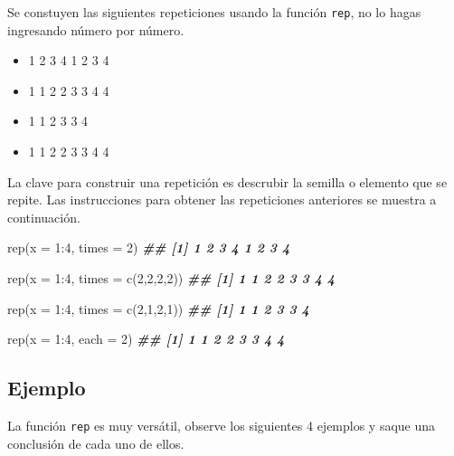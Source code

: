 \documentclass[
]{book}
\newenvironment{Shaded}{\begin{snugshade}}{\end{snugshade}}
\newcommand{\AttributeTok}[1]{\textcolor[rgb]{0.77,0.63,0.00}{#1}}
\newcommand{\DecValTok}[1]{\textcolor[rgb]{0.00,0.00,0.81}{#1}}
\newcommand{\DocumentationTok}[1]{\textcolor[rgb]{0.56,0.35,0.01}{\textbf{\textit{#1}}}}
\newcommand{\FunctionTok}[1]{\textcolor[rgb]{0.00,0.00,0.00}{#1}}
\newcommand{\NormalTok}[1]{#1}
\newcommand{\SpecialCharTok}[1]{\textcolor[rgb]{0.00,0.00,0.00}{#1}}
\providecommand{\tightlist}{%
  \setlength{\itemsep}{0pt}\setlength{\parskip}{0pt}}
\begin{document}
Se constuyen las siguientes repeticiones usando la función \texttt{rep}, no lo hagas ingresando número por número.

\begin{itemize}
\tightlist
\item
  1 2 3 4 1 2 3 4
\item
  1 1 2 2 3 3 4 4
\item
  1 1 2 3 3 4
\item
  1 1 2 2 3 3 4 4
\end{itemize}

La clave para construir una repetición es descrubir la semilla o elemento que se repite. Las instrucciones para obtener las repeticiones anteriores se muestra a continuación.

\begin{Shaded}
\begin{Highlighting}[]
\FunctionTok{rep}\NormalTok{(}\AttributeTok{x =} \DecValTok{1}\SpecialCharTok{:}\DecValTok{4}\NormalTok{, }\AttributeTok{times =} \DecValTok{2}\NormalTok{)}
\DocumentationTok{\#\# [1] 1 2 3 4 1 2 3 4}

\FunctionTok{rep}\NormalTok{(}\AttributeTok{x =} \DecValTok{1}\SpecialCharTok{:}\DecValTok{4}\NormalTok{, }\AttributeTok{times =} \FunctionTok{c}\NormalTok{(}\DecValTok{2}\NormalTok{,}\DecValTok{2}\NormalTok{,}\DecValTok{2}\NormalTok{,}\DecValTok{2}\NormalTok{))}
\DocumentationTok{\#\# [1] 1 1 2 2 3 3 4 4}

\FunctionTok{rep}\NormalTok{(}\AttributeTok{x =} \DecValTok{1}\SpecialCharTok{:}\DecValTok{4}\NormalTok{, }\AttributeTok{times =} \FunctionTok{c}\NormalTok{(}\DecValTok{2}\NormalTok{,}\DecValTok{1}\NormalTok{,}\DecValTok{2}\NormalTok{,}\DecValTok{1}\NormalTok{))}
\DocumentationTok{\#\# [1] 1 1 2 3 3 4}

\FunctionTok{rep}\NormalTok{(}\AttributeTok{x =} \DecValTok{1}\SpecialCharTok{:}\DecValTok{4}\NormalTok{, }\AttributeTok{each =} \DecValTok{2}\NormalTok{)}
\DocumentationTok{\#\# [1] 1 1 2 2 3 3 4 4}
\end{Highlighting}
\end{Shaded}

\hypertarget{ejemplo-12}{%
\subsection*{Ejemplo}\label{ejemplo-12}}

La función \texttt{rep} es muy versátil, observe los siguientes 4 ejemplos y saque una conclusión de cada uno de ellos.
\end{document}
